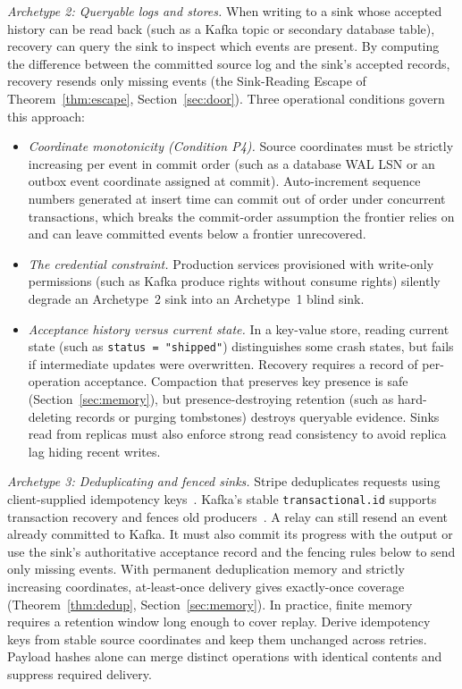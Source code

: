 \documentclass[sigplan,10pt]{acmart}
\theoremstyle{plain}
\theoremstyle{definition}
\let\origtexttt\texttt
\renewcommand{\texttt}[1]{{\origtexttt{\def\_{\textunderscore\allowbreak}#1}}}
\begin{document}
\emph{Archetype 2: Queryable logs and stores.}
When writing to a sink whose accepted history can be read back (such as a
Kafka topic or secondary database table), recovery can query the sink to
inspect which events are present. By computing the difference between the
committed source log and the sink's accepted records, recovery resends only
missing events (the Sink-Reading Escape of Theorem~\ref{thm:escape},
Section~\ref{sec:door}). Three operational conditions govern this approach:
\begin{itemize}
\item \emph{Coordinate monotonicity (Condition P4).} Source coordinates must
  be strictly increasing per event in commit order (such as a database WAL LSN
  or an outbox event coordinate assigned at commit). Auto-increment sequence
  numbers generated at insert time can commit out of order under concurrent
  transactions, which breaks the commit-order assumption the frontier
  relies on and can leave committed events below a frontier unrecovered.
\item \emph{The credential constraint.} Production services provisioned with
  write-only permissions (such as Kafka produce rights without consume
  rights) silently degrade an Archetype~2 sink into an Archetype~1 blind sink.
\item \emph{Acceptance history versus current state.} In a key-value store,
  reading current state (such as \texttt{status = "shipped"}) distinguishes
  some crash states, but fails if intermediate updates were overwritten.
  Recovery requires a record of per-operation acceptance. Compaction that
  preserves key presence is safe (Section~\ref{sec:memory}), but
  presence-destroying retention (such as hard-deleting records or purging
  tombstones) destroys queryable evidence. Sinks read from replicas must also
  enforce strong read consistency to avoid replica lag hiding recent writes.
\end{itemize}

\emph{Archetype 3: Deduplicating and fenced sinks.}
Stripe deduplicates requests using client-supplied idempotency keys~\cite{stripe}.
Kafka's stable
\texttt{transactional.id} supports transaction recovery and fences old
producers~\cite{kip98}. A relay can still resend an event already committed
to Kafka. It must also commit its progress with the output
or use the sink's authoritative acceptance record and the fencing rules below
to send only missing events.
With permanent deduplication memory and strictly increasing coordinates,
at-least-once delivery gives exactly-once
coverage (Theorem~\ref{thm:dedup}, Section~\ref{sec:memory}). In practice,
finite memory requires a retention window long enough to cover replay.
Derive idempotency keys from stable source coordinates and keep them unchanged
across retries. Payload hashes alone can merge distinct operations with identical
contents and suppress required delivery.
\end{document}
